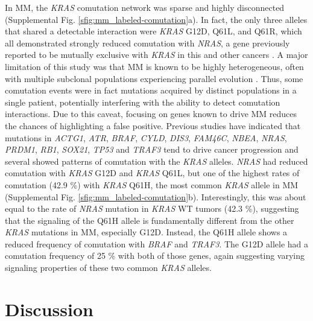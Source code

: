 \documentclass[english, 12pt, letterpaper]{article}
\newcommand{\KRAS}{\emph{KRAS}}
\begin{document}
In MM, the \KRAS{} comutation network was sparse and highly disconnected (Supplemental Fig. \ref{sfig:mm_labeled-comutation}a).
In fact, the only three alleles that shared a detectable interaction were \KRAS{} G12D, Q61L, and Q61R, which all demonstrated strongly reduced comutation with \emph{NRAS}, a gene previously reported to be mutually exclusive with \KRAS{} in this and other cancers \cite{Lohr2014WidespreadTherapy.}.
A major limitation of this study was that MM is known to be highly heterogeneous, often with multiple subclonal populations experiencing parallel evolution \cite{Melchor2014Single-cellMyeloma., Lionetti2015MolecularActivation., Keats2012ClonalMyeloma., Corre2015GeneticsLevel, Lohr2016GeneticResolution., Lohr2014WidespreadTherapy., Xu2017MolecularActivation.}.
Thus, some comutation events were in fact mutations acquired by distinct populations in a single patient, potentially interfering with the ability to detect comutation interactions.
Due to this caveat, focusing on genes known to drive MM reduces the chances of highlighting a false positive. Previous studies have indicated that mutations in \emph{ACTG1}, \emph{ATR}, \emph{BRAF}, \emph{CYLD}, \emph{DIS3}, \emph{FAM46C}, \emph{NBEA}, \emph{NRAS}, \emph{PRDM1}, \emph{RB1}, \emph{SOX21}, \emph{TP53} and \emph{TRAF3} tend to drive cancer progression \cite{Lohr2014WidespreadTherapy., Sondka2018} and several showed patterns of comutation with the \KRAS{} alleles.
\emph{NRAS} had reduced comutation with \KRAS{} G12D and \KRAS{} Q61L, but one of the highest rates of comutation (42.9 \%) with \KRAS{} Q61H, the most common \KRAS{} allele in MM (Supplemental Fig. \ref{sfig:mm_labeled-comutation}b).
Interestingly, this was about equal to the rate of \emph{NRAS} mutation in \KRAS{} WT tumors (42.3 \%), suggesting that the signaling of the Q61H allele is fundamentally different from the other \KRAS{} mutations in MM, especially G12D.
Instead, the Q61H allele shows a reduced frequency of comutation with \emph{BRAF} and \emph{TRAF3}.
The G12D allele had a comutation frequency of 25 \% with both of those genes, again suggesting varying signaling properties of these two common \KRAS{} alleles.




\section*{Discussion}
\end{document}
